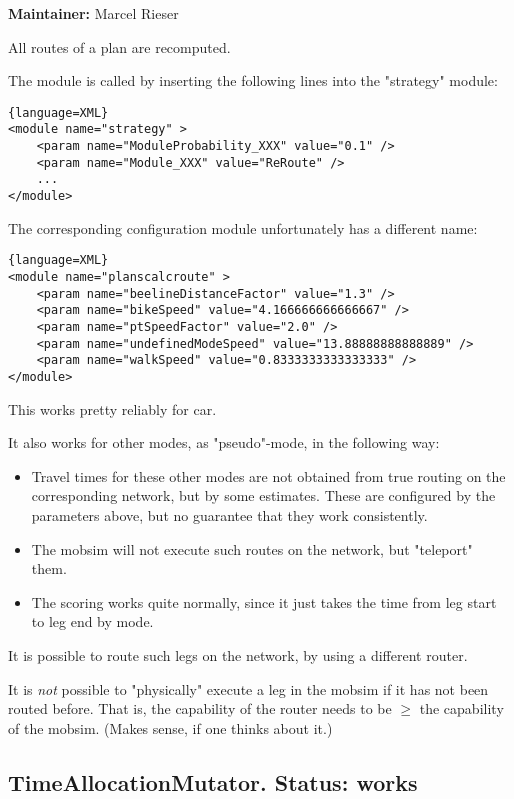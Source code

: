\textbf{Maintainer:} Marcel Rieser

All routes of a plan are recomputed.

The module is called by inserting the following lines into the "strategy" module:
\begin{lstlisting}{language=XML}
<module name="strategy" >
    <param name="ModuleProbability_XXX" value="0.1" />
    <param name="Module_XXX" value="ReRoute" />
    ...
</module>
\end{lstlisting}


The corresponding configuration module unfortunately has a different name:
\begin{lstlisting}{language=XML}
<module name="planscalcroute" >
    <param name="beelineDistanceFactor" value="1.3" />
    <param name="bikeSpeed" value="4.166666666666667" />
    <param name="ptSpeedFactor" value="2.0" />
    <param name="undefinedModeSpeed" value="13.88888888888889" />
    <param name="walkSpeed" value="0.8333333333333333" />
</module>
\end{lstlisting}

This works pretty reliably for car.

It also works for other modes, as "pseudo"-mode, in the following way:
\begin{itemize}
	\item Travel times for these other modes are not obtained from true  routing on the corresponding network, but by some estimates. These  are configured by the parameters above, but no guarantee that they work  consistently.
	\item The mobsim will not execute such routes on the network, but "teleport" them.
	\item The scoring works quite normally, since it just takes the time from leg start to leg end by mode.
\end{itemize}

It is possible to route such legs on the network, by using a different router.

It is \emph{not} possible to "physically" execute a leg in the  mobsim if it has not been routed before. That is, the capability  of the router needs to be $\ge$ the capability of the mobsim.  (Makes sense, if one thinks about it.)

\subsection{TimeAllocationMutator.  Status: works}

